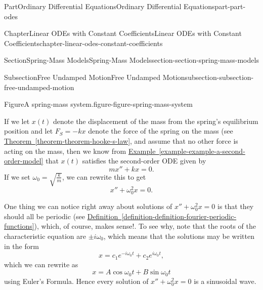 \documentclass[twoside,10pt,]{book}
\newcommand{\xreffont}{\relax}
\numberwithin{equation}{part}
\begin{document}
\begin{partptx}{Part}{Ordinary Differential Equations}{}{Ordinary Differential Equations}{}{}{part-part-odes}
\begin{chapterptx}{Chapter}{Linear ODEs with Constant Coefficients}{}{Linear ODEs with Constant Coefficients}{}{}{chapter-linear-odes-constant-coefficients}
\begin{sectionptx}{Section}{Spring-Mass Models}{}{Spring-Mass Models}{}{}{section-section-spring-mass-models}
\begin{subsectionptx}{Subsection}{Free Undamped Motion}{}{Free Undamped Motion}{}{}{subsection-subsection-free-undamped-motion}
\begin{figureptx}{Figure}{A spring-mass system.}{figure-figure-spring-mass-system}{}
\begin{image}{0}{1}{0}{}
{
}%
\end{image}%
\tcblower
\end{figureptx}%
If we let \(x(t)\) denote the displacement of the mass from the spring's equilibrium position and let \(F_{S} = -kx\) denote the force of the spring on the mass (see \hyperref[theorem-theorem-hooke-s-law]{Theorem~{\xreffont\ref{theorem-theorem-hooke-s-law}}}, and assume that no other force is acting on the mass, then we know from \hyperref[example-example-a-second-order-model]{Example~{\xreffont\ref{example-example-a-second-order-model}}} that \(x(t)\) satisfies the second-order ODE given by%
\begin{equation*}
mx'' + kx = 0.
\end{equation*}
If we set \(\omega_{0} = \sqrt{\frac{k}{m}}\), we can rewrite this to get%
\begin{equation*}
x'' + \omega_{0}^{2}x = 0.
\end{equation*}
%
\par
One thing we can notice right away about solutions of \(x''+\omega_{0}^{2}x = 0\) is that they should all be periodic (see \hyperref[definition-definition-fourier-periodic-functions]{Definition~{\xreffont\ref{definition-definition-fourier-periodic-functions}}}), which, of course, makes sense!. To see why, note that the roots of the characteristic equation are \(\pm i\omega_{0}\), which means that the solutions may be written in the form%
\begin{equation*}
x = c_{1}e^{-i\omega_{0}t} + c_{2}e^{i\omega_{0}t},
\end{equation*}
which we can rewrite as%
\begin{equation*}
x = A\cos\omega_{0}t + B\sin\omega_{0}t
\end{equation*}
using Euler's Formula. Hence every solution of \(x''+\omega_{0}^{2}x = 0\) is a sinusoidal wave.%

\end{subsectionptx}
\end{sectionptx}
\end{chapterptx}
\end{partptx}
\end{document}
